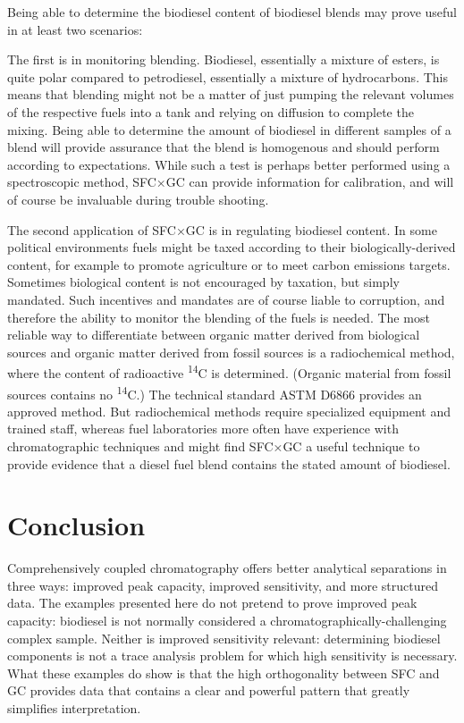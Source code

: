 Being able to determine the biodiesel content of biodiesel blends may prove
useful in at least two scenarios: 

The first is in monitoring blending. Biodiesel, essentially a mixture of esters,
is quite polar compared to petrodiesel, essentially a mixture of hydrocarbons.
This means that blending might not be a matter of just pumping the relevant volumes
of the respective fuels into a tank and relying on diffusion to complete the
mixing. Being able to determine the amount of biodiesel in different samples of
a blend will provide assurance that the blend is homogenous and should perform
according to expectations. While such a test is perhaps better performed using a
spectroscopic method, SFC×GC can provide information for calibration, and will
of course be invaluable during trouble shooting.

The second application of SFC×GC is in regulating biodiesel content. In some
political environments fuels might be taxed according to their
biologically-derived content, for example to promote agriculture or to meet
carbon emissions targets. Sometimes biological content is not encouraged by
taxation, but simply mandated. Such incentives and mandates are of course liable
to corruption, and therefore the ability to monitor the blending of the fuels is
needed. The most reliable way to differentiate between organic matter derived
from biological sources and organic matter derived from fossil sources is a
radiochemical method, where the content of radioactive \textsuperscript{14}C is
determined. (Organic material from fossil sources contains no
\textsuperscript{14}C.) The technical standard ASTM D6866 provides an approved
method. But radiochemical methods require specialized equipment and trained
staff, whereas fuel laboratories more often have experience with chromatographic
techniques and might find SFC×GC a useful technique to provide evidence that a
diesel fuel blend contains the stated amount of biodiesel.

\section{Conclusion}

Comprehensively coupled chromatography offers better analytical separations in
three ways: improved peak capacity, improved sensitivity, and more structured
data. The examples presented here do not pretend to prove improved peak
capacity: biodiesel is not normally considered a chromatographically-challenging
complex sample. Neither is improved sensitivity relevant: determining biodiesel
components is not a trace analysis problem for which high sensitivity is
necessary. What these examples do show is that the high orthogonality between
SFC and GC provides data that contains a clear and powerful pattern that greatly
simplifies interpretation.

